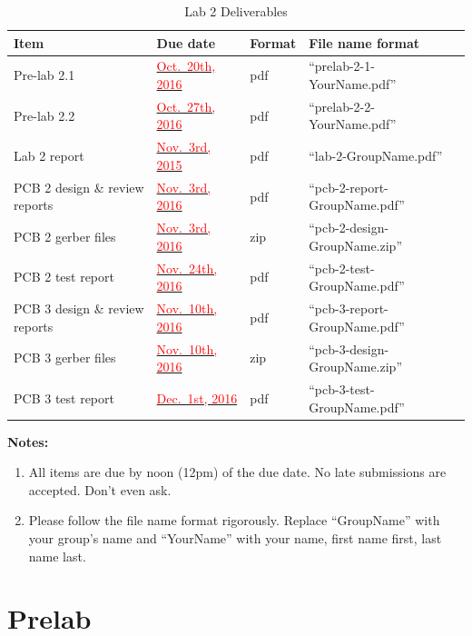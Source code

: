 \documentclass[letterpaper, 11pt]{article}
\newcommand{\due}[1]{\href{https://github.com/ucdart/UCD-EEC134/blob/master/support/schedule/eec134-schedule.pdf}{\textcolor{red}{#1}}}
\begin{document}
\vspace{0.5cm}

\begin{table}[h]
	\footnotesize
	\caption{Lab 2 Deliverables}
	\renewcommand{\arraystretch}{1.2}
	\begin{tabular}{|m{1in}|l|m{0.45in}|m{2in}|}
		\hline
		\textbf{Item} & \textbf{Due date} & \textbf{Format} & \textbf{File name format} \\
		\hline \hline
		Pre-lab 2.1 & \due{Oct.~20th, 2016} & pdf & ``prelab-2-1-YourName.pdf'' \\
		\hline
		Pre-lab 2.2 & \due{Oct.~27th, 2016} & pdf & ``prelab-2-2-YourName.pdf''\\
		\hline
		Lab 2 report & \due{Nov.~3rd, 2015} & pdf & ``lab-2-GroupName.pdf''\\
		\hline
		PCB 2 design \& review reports & \due{Nov.~3rd, 2016} & pdf & ``pcb-2-report-GroupName.pdf''\\
		\hline
		PCB 2 gerber files & \due{Nov.~3rd, 2016} & zip & ``pcb-2-design-GroupName.zip''\\
		\hline
		PCB 2 test report & \due{Nov.~24th, 2016} & pdf & ``pcb-2-test-GroupName.pdf''\\
		\hline
		PCB 3 design \& review reports & \due{Nov.~10th, 2016} & pdf & ``pcb-3-report-GroupName.pdf''\\
		\hline
		PCB 3 gerber files & \due{Nov.~10th, 2016} & zip & ``pcb-3-design-GroupName.zip''\\
		\hline
		PCB 3 test report & \due{Dec.~1st, 2016} & pdf & ``pcb-3-test-GroupName.pdf''\\
		\hline
	\end{tabular}
	\label{tab:deliverables}
\end{table}

\textbf{Notes:}
\begin{enumerate}
	\item All items are due by noon (12pm) of the due date. No late submissions are accepted. Don't even ask. 
	
	\item Please follow the file name format rigorously. Replace ``GroupName'' with your group's name and ``YourName'' with your name, first name first, last name last. 
	
\end{enumerate}
	
\newpage
\section{Prelab}
\end{document}
